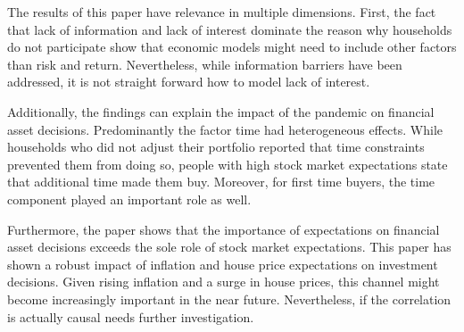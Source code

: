 \documentclass[ProjectABM]{subfiles}
\begin{document}
The results of this paper have relevance in multiple dimensions. First, the fact that lack of information and lack of interest dominate the reason why households do not participate show that economic models might need to include other factors than risk and return. Nevertheless, while information barriers have been addressed, it is not straight forward how to model lack of interest.

Additionally, the findings can explain the impact of the pandemic on financial asset decisions. Predominantly the factor time had heterogeneous effects. While households who did not adjust their portfolio reported that time constraints prevented them from doing so, people with high stock market expectations state that additional time made them buy. Moreover, for first time buyers, the time component played an important role as well. 


Furthermore, the paper shows that the importance of expectations on financial asset decisions exceeds the sole role of stock market expectations. This paper has shown a robust impact of inflation and house price expectations on investment decisions. Given rising inflation and a surge in house prices, this channel might become increasingly important in the near future. Nevertheless, if the correlation is actually causal needs further investigation.

\end{document}
